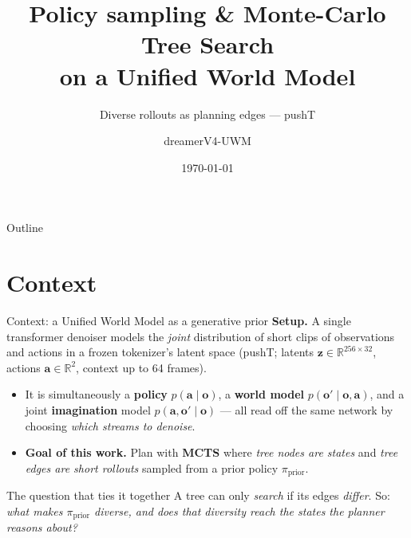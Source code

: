 \documentclass[aspectratio=169]{beamer}
\title[Policy sampling \& MCTS on a UWM]{Policy sampling \& Monte-Carlo Tree Search\\on a Unified World Model}
\subtitle{Diverse rollouts as planning edges --- pushT}
\author{dreamerV4-UWM}
\date{\today}
\newcommand{\R}{\mathbb{R}}
\newcommand{\obs}{\bm{o}}
\newcommand{\act}{\bm{a}}
\newcommand{\zlat}{\bm{z}}
\newcommand{\prior}{\pi_{\mathrm{prior}}}
\begin{document}
\begin{frame}[plain]\titlepage\end{frame}

\begin{frame}{Outline}
  \tableofcontents
\end{frame}

\section{Context}
\begin{frame}{Context: a Unified World Model as a generative prior}
  \textbf{Setup.} A single transformer denoiser models the \emph{joint}
  distribution of short clips of observations and actions in a frozen
  tokenizer's latent space (pushT; latents $\zlat\in\R^{256\times32}$,
  actions $\act\in\R^{2}$, context up to 64 frames).
  \vspace{0.4em}
  \begin{itemize}
    \item It is simultaneously a \textbf{policy} $p(\act\mid\obs)$, a
      \textbf{world model} $p(\obs'\mid\obs,\act)$, and a joint
      \textbf{imagination} model $p(\act,\obs'\mid\obs)$ --- all read off the
      same network by choosing \emph{which streams to denoise}.
    \item \textbf{Goal of this work.} Plan with \textbf{MCTS} where
      \emph{tree nodes are states} and \emph{tree edges are short rollouts}
      sampled from a prior policy $\prior$.
  \end{itemize}
  \vspace{0.4em}
  \begin{block}{The question that ties it together}
    A tree can only \emph{search} if its edges \emph{differ}.
    So: \emph{what makes $\prior$ diverse, and does that diversity reach the
    states the planner reasons about?}
  \end{block}
\end{frame}

\end{document}
